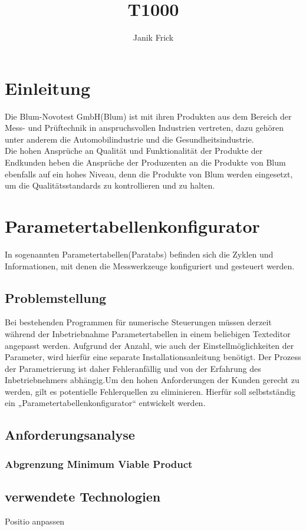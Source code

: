 \documentclass[10pt,a4paper]{article}
\author{Janik Frick}
\title{T1000}
\begin{document}

\tableofcontents
\newpage
\section{Einleitung}
Die Blum-Novotest GmbH(Blum) ist mit ihren Produkten aus dem Bereich der Mess- und Prüftechnik in anspruchsvollen Industrien vertreten, dazu gehören unter anderem die Automobilindustrie und die Gesundheitsindustrie. \\
Die hohen Ansprüche an Qualität und Funktionalität der Produkte der Endkunden heben die Ansprüche der Produzenten an die Produkte von Blum ebenfalls auf ein hohes Niveau, denn die Produkte von Blum werden eingesetzt, um die Qualitätsstandards zu kontrollieren und zu halten. \\

\section{Parametertabellenkonfigurator}
In sogenannten Parametertabellen(Paratabs) befinden sich die Zyklen und Informationen, mit denen die Messwerkzeuge konfiguriert und gesteuert werden. 
\subsection{Problemstellung}
Bei bestehenden Programmen für numerische Steuerungen müssen derzeit während der Inbetriebnahme Parametertabellen in einem beliebigen Texteditor angepasst werden. Aufgrund der Anzahl, wie auch der Einstellmöglichkeiten der Parameter, wird hierfür eine separate Installationsanleitung benötigt. Der Prozess der Parametrierung ist daher Fehleranfällig und von der Erfahrung des Inbetriebnehmers abhängig.Um den hohen Anforderungen der Kunden gerecht zu werden, gilt es potentielle Fehlerquellen zu eliminieren. Hierfür soll selbstständig ein „Parametertabellenkonfigurator“ entwickelt werden.
\subsection{Anforderungsanalyse}
\subsubsection{Abgrenzung Minimum Viable Product}
\subsection{verwendete Technologien}
Positio anpassen
\end{document}
